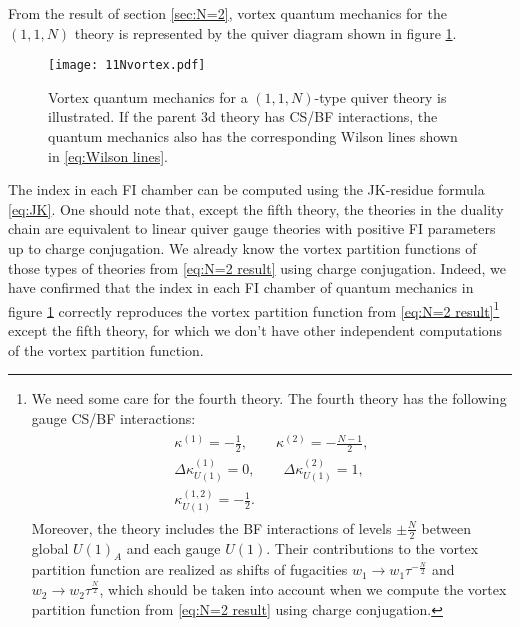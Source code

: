 \documentclass[a4paper,11pt]{article}
\begin{document}
From the result of section \ref{sec:N=2}, vortex quantum mechanics for the $(1,1,N)$ theory is represented by the quiver diagram shown in figure \ref{fig:11N vortex}.
%
\begin{figure}[tbp]
\centering %
\texttt{[image: 11Nvortex.pdf]}
\caption{\label{fig:11N vortex} Vortex quantum mechanics for a $(1,1,N)$-type quiver theory is illustrated. If the parent 3d theory has CS/BF interactions, the quantum mechanics also has the corresponding Wilson lines shown in \eqref{eq:Wilson lines}.}
\end{figure}
%
The index in each FI chamber can be computed using the JK-residue formula \eqref{eq:JK}. One should note that, except the fifth theory, the theories in the duality chain are equivalent to linear quiver gauge theories with positive FI parameters up to charge conjugation. We already know the vortex partition functions of those types of theories from \eqref{eq:N=2 result} using charge conjugation. Indeed, we have confirmed that the index in each FI chamber of quantum mechanics in figure \ref{fig:11N vortex} correctly reproduces the vortex partition function from \eqref{eq:N=2 result}\footnote{We need some care for the fourth theory. The fourth theory has the following gauge CS/BF interactions:
\begin{gather}
\begin{gathered}
\kappa^{(1)} = -\frac{1}{2}, \qquad \kappa^{(2)} = -\frac{N-1}{2}, \\
\Delta \kappa_{U(1)}^{(1)} = 0, \qquad \Delta \kappa_{U(1)}^{(2)} = 1, \\
\kappa_{U(1)}^{(1,2)} = -\frac{1}{2}.
\end{gathered}
\end{gather}
Moreover, the theory includes the BF interactions of levels $\pm \frac{N}{2}$ between global $U(1)_A$ and each gauge $U(1)$. Their contributions to the vortex partition function are realized as shifts of fugacities $w_1 \rightarrow w_1 \tau^{-\frac{N}{2}}$ and $w_2 \rightarrow w_2  \tau^{\frac{N}{2}}$, which should be taken into account when we compute the vortex partition function from \eqref{eq:N=2 result} using charge conjugation.} except the fifth theory, for which we don't have other independent computations of the vortex partition function.
\end{document}
